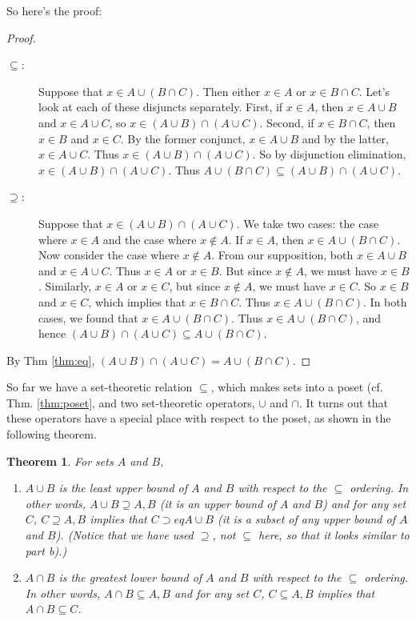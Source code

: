\documentclass[12pt]{article}
\newcounter{thmc}
\newtheorem{thm}[thmc]{Theorem}
\begin{document}
So here's the proof:

\begin{proof}
  \begin{description}
    \item[$\subseteq$:] Suppose that $x\in A\cup(B\cap C)$.  Then
      either $x\in A$ or $x\in B\cap C$.  Let's look at each of these
      disjuncts separately.  First, if $x\in A$, then $x\in A\cup B$
      and $x\in A\cup C$, so $x\in (A\cup B)\cap(A\cup C)$.  Second,
      if $x\in B\cap C$, then $x\in B$ and $x\in C$.  By the former
      conjunct, $x\in A\cup B$ and by the latter, $x\in A\cup C$.
      Thus $x\in (A\cup B)\cap(A\cup C)$.  So by disjunction
      elimination, $x\in (A\cup B)\cap(A\cup C)$.  Thus $A\cup(B\cap
      C)\subseteq (A\cup B)\cap(A\cup C)$.
    \item[$\supseteq$:] Suppose that $x\in (A\cup B)\cap(A\cup C)$.
      We take two cases: the case where $x\in A$ and the case where
      $x\not\in A$.  If $x\in A$, then $x\in A\cup(B\cap C)$.  Now
      consider the case where $x\not\in A$.  From our supposition,
      both $x\in A\cup B$ and $x\in A\cup C$.  Thus $x\in A$ or $x\in
      B$.  But since $x\not\in A$, we must have $x\in B$.  Similarly,
      $x\in A$ or $x\in C$, but since $x\not\in A$, we must have $x\in
      C$.  So $x\in B$ and $x\in C$, which implies that $x\in B\cap
      C$.  Thus $x\in A\cup (B\cap C)$.  In both cases, we found that
      $x\in A\cup (B\cap C)$.  Thus $x\in A\cup (B\cap C)$, and hence
      $(A\cup B)\cap(A\cup C)\subseteq A\cup (B\cap C)$.
  \end{description}
  By Thm \ref{thm:eq}, $(A\cup B)\cap(A\cup C) = A\cup (B\cap C)$.
\end{proof}

So far we have a set-theoretic relation $\subseteq$, which makes sets
into a poset (cf. Thm. \ref{thm:poset}, and two set-theoretic
operators, $\cup$ and $\cap$.  It turns out that these operators have
a special place with respect to the poset, as shown in the following
theorem.

\begin{thm}
  For sets $A$ and $B$,
  \begin{enumerate}[label=\alph*)]
    \item $A\cup B$ is the \textit{least upper bound} of $A$ and $B$
      with respect to the $\subseteq$ ordering.  In other words,
      $A\cup B\supseteq A, B$ (it is \textit{an} upper bound of $A$
      and $B$) and for any set $C$, $C\supseteq A, B$ implies that
      $C\supset eq A\cup B$ (it is a subset of any upper bound of $A$
      and $B$). (Notice that we have used $\supseteq$, not $\subseteq$
      here, so that it looks similar to part b).)
    \item $A\cap B$ is the \textit{greatest lower bound} of $A$ and
      $B$ with respect to the $\subseteq$ ordering.  In other words,
      $A\cap B\subseteq A,B$ and for any set $C$, $C\subseteq A,B$
      implies that $A\cap B \subseteq C$.
  \end{enumerate}
\end{thm}
\end{document}
